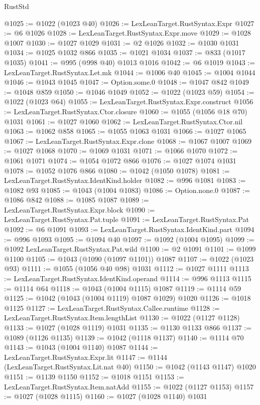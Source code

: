 \begin{lexlean}{RustStd}
\begin{coremodule}
@1025 := @1022 (@1023 @40)
@1026 := LexLeanTarget.RustSyntax.Expr
@1027 := @6 @1026
@1028 := LexLeanTarget.RustSyntax.Expr.move
@1029 := @1028 @1007
@1030 := @1027 @1029
@1031 := @2 @1026
@1032 := @1030 @1031
@1034 := @1025 @1032 @866
@1035 := @1021 @1034
@1037 := @833 (@1017 @1035)
@1041 := @995 (@998 @40) @1013 @1016
@1042 := @6 @1019
@1043 := LexLeanTarget.RustSyntax.Let.mk
@1044 := @1006 @40
@1045 := @1004 @1044
@1046 := @1043 @1045
@1047 := Option.some.{0}
@1048 := @1047 @842
@1049 := @1048 @859
@1050 := @1046 @1049
@1052 := @1022 (@1023 @59)
@1054 := @1022 (@1023 @64)
@1055 := LexLeanTarget.RustSyntax.Expr.construct
@1056 := LexLeanTarget.RustSyntax.Ctor.closure
@1060 := @1055 (@1056 @18 @70) @1031
@1061 := @1027 @1060
@1062 := LexLeanTarget.RustSyntax.Ctor.nil
@1063 := @1062 @858
@1065 := @1055 @1063 @1031
@1066 := @1027 @1065
@1067 := LexLeanTarget.RustSyntax.Expr.clone
@1068 := @1067 @1007
@1069 := @1027 @1068
@1070 := @1069 @1031
@1071 := @1066 @1070
@1072 := @1061 @1071
@1074 := @1054 @1072 @866
@1076 := @1027 @1074 @1031
@1078 := @1052 @1076 @866
@1080 := @1042 (@1050 @1078)
@1081 := LexLeanTarget.RustSyntax.IdentKind.holder
@1082 := @996 @1081
@1083 := @1082 @93
@1085 := @1043 (@1004 @1083)
@1086 := Option.none.{0}
@1087 := @1086 @842
@1088 := @1085 @1087
@1089 := LexLeanTarget.RustSyntax.Expr.block
@1090 := LexLeanTarget.RustSyntax.Pat.tuple
@1091 := LexLeanTarget.RustSyntax.Pat
@1092 := @6 @1091
@1093 := LexLeanTarget.RustSyntax.IdentKind.part
@1094 := @996 @1093
@1095 := @1094 @40
@1097 := @1092 (@1004 @1095)
@1099 := @1092 LexLeanTarget.RustSyntax.Pat.wild
@1100 := @2 @1091
@1101 := @1099 @1100
@1105 := @1043 (@1090 (@1097 @1101)) @1087
@1107 := @1022 (@1023 @93)
@1111 := @1055 (@1056 @40 @98) @1031
@1112 := @1027 @1111
@1113 := LexLeanTarget.RustSyntax.IdentKind.operand
@1114 := @996 @1113
@1115 := @1114 @64
@1118 := @1043 (@1004 @1115) @1087
@1119 := @1114 @59
@1125 := @1042 (@1043 (@1004 @1119) @1087 @1029) @1020
@1126 := @1018 @1125
@1127 := LexLeanTarget.RustSyntax.Callee.runtime
@1128 := LexLeanTarget.RustSyntax.Item.lengthList
@1130 := @1022 (@1127 @1128)
@1133 := @1027 (@1028 @1119) @1031
@1135 := @1130 @1133 @866
@1137 := @1089 (@1126 @1135)
@1139 := @1042 (@1118 @1137)
@1140 := @1114 @70
@1143 := @1043 (@1004 @1140) @1087
@1144 := LexLeanTarget.RustSyntax.Expr.lit
@1147 := @1144 (LexLeanTarget.RustSyntax.Lit.nat @40)
@1150 := @1042 (@1143 @1147) @1020
@1151 := @1139 @1150
@1152 := @1018 @1151
@1153 := LexLeanTarget.RustSyntax.Item.natAdd
@1155 := @1022 (@1127 @1153)
@1157 := @1027 (@1028 @1115)
@1160 := @1027 (@1028 @1140) @1031

\end{coremodule}
\end{lexlean}
